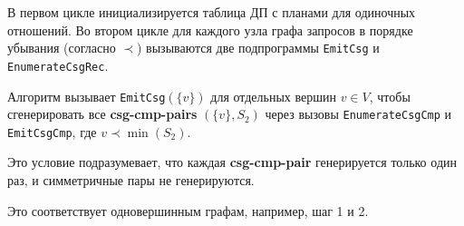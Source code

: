 \documentclass[12pt]{article}
\begin{document}
\begin{flushleft}
\begin{center}
\end{center}

\begin{center}
\end{center}

В первом цикле инициализируется таблица ДП с планами для одиночных отношений.  
Во втором цикле для каждого узла графа запросов в порядке убывания (согласно $\prec$)  
вызываются две подпрограммы \texttt{EmitCsg} и \texttt{EnumerateCsgRec}.  

Алгоритм вызывает \texttt{EmitCsg}$(\{v\})$ для отдельных вершин $v \in V$,  
чтобы сгенерировать все \textbf{csg-cmp-pairs} $(\{v\}, S_2)$ через вызовы  
\texttt{EnumerateCsgCmp} и \texttt{EmitCsgCmp}, где $v \prec \min(S_2)$.  

Это условие подразумевает, что каждая \textbf{csg-cmp-pair} генерируется только один раз,  
и симметричные пары не генерируются.  

Это соответствует одновершинным графам, например, шаг 1 и 2.


\end{flushleft}
\end{document}

